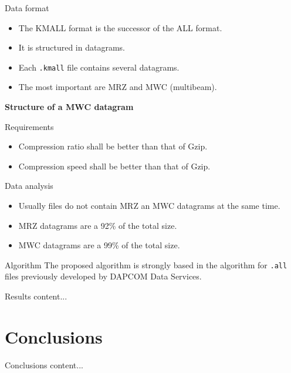 \documentclass[usenames,dvipsnames]{beamer}
\begin{document}
\begin{frame}{Data format}
\begin{itemize}
	\item<1-> The KMALL format is the successor of the ALL format.
	\item<2-> It is structured in datagrams.
	\item<3-> Each \texttt{.kmall} file contains several datagrams.
	\item<4-> The most important are MRZ and MWC (multibeam).
\end{itemize}
\vspace{1em}

\textbf{Structure of a MWC datagram}
\vspace{1em}

\centering
{}\scalebox{.42}{}
\end{frame}

\begin{frame}{Requirements}
\begin{itemize}
	\item<1-> Compression ratio shall be better than that of Gzip.
	\item<1-> Compression speed shall be better than that of Gzip.
\end{itemize}
\end{frame}

\begin{frame}{Data analysis}
\begin{itemize}
	\item<1-> Usually files do not contain MRZ an MWC datagrams at the same time.
	\item<2-> MRZ datagrams are a 92\% of the total size.
	\item<3-> MWC datagrams are a 99\% of the total size.
\end{itemize}
\end{frame}

\begin{frame}{Algorithm}
The proposed algorithm is strongly based in the algorithm for \texttt{.all} files previously developed by DAPCOM Data Services.

\end{frame}
\begin{frame}{Results}
	content...
\end{frame}

\section{Conclusions}
\begin{frame}{Conclusions}
	content...
\end{frame}
\end{document}

